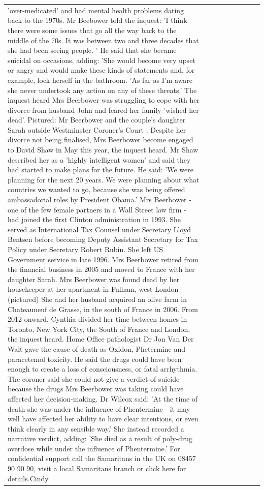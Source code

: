 \begin{table}[H]
\begin{tabular}{lllrlllll}
'over-medicated' and had mental health problems dating back to the 1970s. Mr Beebower told the inquest: 'I think there were some issues that go all the way back to the middle of the 70s. It was between two and three decades that she had been seeing people. ' He said that she became suicidal on occasions, adding: 'She would become very upset or angry and would make these kinds of statements and, for example, lock herself in the bathroom. 'As far as I'm aware she never undertook any action on any of these threats.' The inquest heard Mrs Beerbower was struggling to cope with her divorce from husband John and feared her family 'wished her dead'. Pictured: Mr Beerbower and the couple's daughter Sarah outside Westminster Coroner's Court . Despite her divorce not being finalised, Mrs Beerbower become engaged to David Shaw in May this year, the inquest heard. Mr Shaw described her as a 'highly intelligent women' and said they had started to make plans for the future. He said: 'We were planning for the next 20 years. We were planning about what countries we wanted to go, because she was being offered ambassadorial roles by President Obama.' Mrs Beerbower - one of the few female partners in a Wall Street law firm - had joined the first Clinton administration in 1993. She served as International Tax Counsel under Secretary Lloyd Bentsen before becoming Deputy Assistant Secretary for Tax Policy under Secretary Robert Rubin. She left US Government service in late 1996. Mrs Beerbower retired from the financial business in 2005 and moved to France with her daughter Sarah. Mrs Beerbower was found dead by her housekeeper at her apartment in Fulham, west London (pictured) She and her husband acquired an olive farm in Chateauneuf de Grasse, in the south of France in 2006. From 2012 onward, Cynthia divided her time between homes in Toronto, New York City, the South of France and London, the inquest heard. Home Office pathologist Dr Jon Van Der Walt gave the cause of death as Oxidon, Phetermine and paracetemol toxicity. He said the drugs could have been enough to create a loss of consciousness, or fatal arrhythmia. The coroner said she could not give a verdict of suicide because the drugs Mrs Beerbower was taking could have affected her decision-making. Dr Wilcox said: 'At the time of death she was under the influence of Phentermine - it may well have affected her ability to have clear intentions, or even think clearly in any sensible way.' She instead recorded a narrative verdict, adding: 'She died as a result of poly-drug overdose while under the influence of Phentermine.' For confidential support call the Samaritans in the UK on 08457 90 90 90, visit a local Samaritans branch or click here for details.Cindy \\

\end{tabular}
\end{table}
